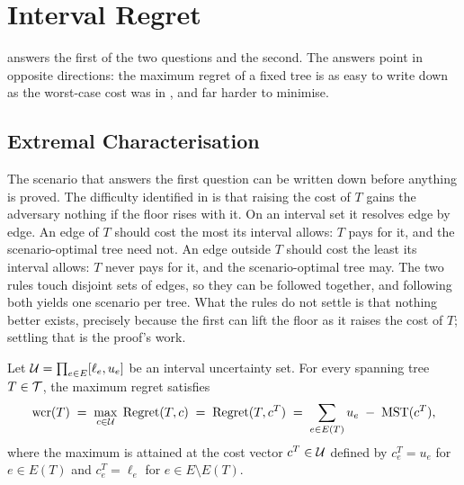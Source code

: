 \section{Interval Regret}\label{sec:regret-interval}

 answers the first of the two questions and  the second.
The answers point in opposite directions: the maximum regret of a fixed tree is as easy to write down as the worst-case cost was in , and far harder to minimise.

\subsection{Extremal Characterisation}\label{sec:regret-extremal}

The scenario that answers the first question can be written down before anything is proved.
The difficulty identified in  is that raising the cost of $T$ gains the adversary nothing if the floor rises with it.
On an interval set it resolves edge by edge.
An edge of $T$ should cost the most its interval allows: $T$ pays for it, and the scenario-optimal tree need not.
An edge outside $T$ should cost the least its interval allows: $T$ never pays for it, and the scenario-optimal tree may.
The two rules touch disjoint sets of edges, so they can be followed together, and following both yields one scenario per tree.
What the rules do not settle is that nothing better exists, precisely because the first can lift the floor as it raises the cost of $T$; settling that is the proof's work.

\begin{lemma}\label{lem:interval-extremal-regret}
Let $\mathcal{U} = \prod_{e \in E} [\ell_e, u_e]$ be an interval uncertainty set.
For every spanning tree $T \in \mathcal{T}$, the maximum regret satisfies
\[
\mathrm{wcr}(T) \;=\; \max_{c \in \mathcal{U}}\; \operatorname{Regret}(T,c) \;=\; \operatorname{Regret}(T,c^{T}) \;=\; \sum_{e \in E(T)} u_e \;-\; \mathrm{MST}(c^{T}),
\]
where the maximum is attained at the cost vector $c^{T} \in \mathcal{U}$ defined by $c^{T}_e = u_e$ for $e \in E(T)$ and $c^{T}_e = \ell_e$ for $e \in E \setminus E(T)$.
\end{lemma}


